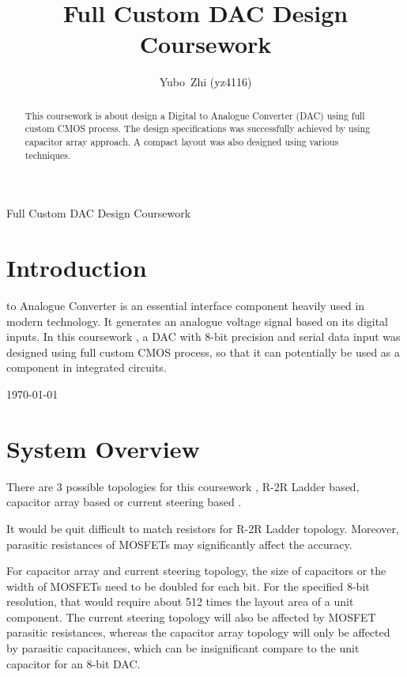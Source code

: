 \documentclass[journal]{IEEEtran}
\begin{document}
\title{Full Custom DAC Design Coursework}

\author{Yubo~Zhi (yz4116)}

%
{Full Custom DAC Design Coursework}

\maketitle

\begin{abstract}
This coursework is about design a Digital to Analogue Converter (DAC) using full custom CMOS process. The design specifications was successfully achieved by using capacitor array approach. A compact layout was also designed using various techniques.
\end{abstract}

\section{Introduction}
 to Analogue Converter is an essential interface component heavily used in modern technology. It generates an analogue voltage signal based on its digital inputs. In this coursework \cite{cw}, a DAC with 8-bit precision and serial data input was designed using full custom CMOS process, so that it can potentially be used as a component in integrated circuits.
 
\hfill \today

\section{System Overview}

There are 3 possible topologies for this coursework \cite{cw}, R-2R Ladder based, capacitor array based or current steering based \cite{dac}.

It would be quit difficult to match resistors for R-2R Ladder topology. Moreover, parasitic resistances of MOSFETs may significantly affect the accuracy.

For capacitor array and current steering topology, the size of capacitors or the width of MOSFETs need to be doubled for each bit. For the specified 8-bit resolution, that would require about 512 times the layout area of a unit component. The current steering topology will also be affected by MOSFET parasitic resistances, whereas the capacitor array topology will only be affected by parasitic capacitances, which can be insignificant compare to the unit capacitor for an 8-bit DAC.
\end{document}
